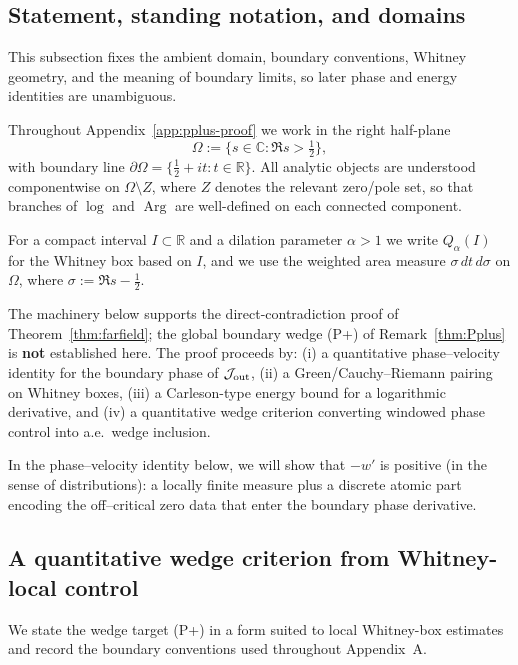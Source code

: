 \documentclass[11pt]{amsart}
\theoremstyle{definition}
\theoremstyle{remark}
\DeclareMathOperator{\Arg}{Arg}
\begin{document}
\subsection{Statement, standing notation, and domains}

\label{appA:setup}

This subsection fixes the ambient domain, boundary conventions, Whitney geometry, and the meaning of boundary limits, so later phase and energy identities are unambiguous.

Throughout Appendix~\ref{app:pplus-proof} we work in the right half-plane
\[
  \Omega:=\{s\in\mathbb C:\Re s>\tfrac12\},
\]
with boundary line $\partial\Omega=\{\tfrac12+it:t\in\mathbb R\}$.
All analytic objects are understood componentwise on $\Omega\setminus Z$, where $Z$ denotes the relevant zero/pole set,
so that branches of $\log$ and $\Arg$ are well-defined on each connected component.

For a compact interval $I\subset\mathbb R$ and a dilation parameter $\alpha>1$ we write $Q_\alpha(I)$ for the Whitney box
based on $I$, and we use the weighted area measure $\sigma\,dt\,d\sigma$ on $\Omega$, where $\sigma:=\Re s-\tfrac12$.

The machinery below supports the direct-contradiction proof of Theorem~\ref{thm:farfield};
the global boundary wedge \textup{(P+)} of Remark~\ref{thm:Pplus} is \textbf{not} established here.
The proof proceeds by:
(i) a quantitative phase--velocity identity for the boundary phase of $\mathcal J_{\rm out}$,
(ii) a Green/Cauchy--Riemann pairing on Whitney boxes,
(iii) a Carleson-type energy bound for a logarithmic derivative,
and (iv) a quantitative wedge criterion converting windowed phase control into a.e.\ wedge inclusion.

In the phase--velocity identity below, we will show that $-w'$ is positive (in the sense of distributions): a locally finite measure plus a discrete atomic part encoding the off--critical zero data that enter the boundary phase derivative.

\subsection{A quantitative wedge criterion from Whitney-local control}

\label{app:whitney-wedge}

We state the wedge target (P+) in a form suited to local Whitney-box estimates and record the boundary conventions used throughout Appendix~A.
\end{document}

